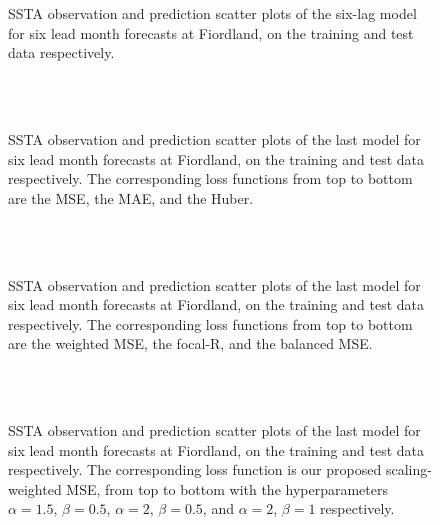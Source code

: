 \documentclass[11pt, a4paper]{article}
\begin{document}
\begin{figure}[H]
\centering
{}
\caption{SSTA observation and prediction scatter plots of the six-lag model for six lead month forecasts at Fiordland, on the training and test data respectively.}
\end{figure}

\begin{figure}[H]
\centering
{}
\\
\\
\caption{SSTA observation and prediction scatter plots of the last model for six lead month forecasts at Fiordland, on the training and test data respectively. The corresponding loss functions from top to bottom are the MSE, the MAE, and the Huber.}
\end{figure}

\begin{figure}[H]
\centering
{}
\\
\\
\caption{SSTA observation and prediction scatter plots of the last model for six lead month forecasts at Fiordland, on the training and test data respectively. The corresponding loss functions from top to bottom are the weighted MSE, the focal-R, and the balanced MSE.}
\end{figure}

\begin{figure}[H]
\centering
{}
\\
\\
\caption{SSTA observation and prediction scatter plots of the last model for six lead month forecasts at Fiordland, on the training and test data respectively. The corresponding loss function is our proposed scaling-weighted MSE, from top to bottom with the hyperparameters $\alpha=1.5$, $\beta=0.5$, $\alpha=2$, $\beta=0.5$, and $\alpha=2$, $\beta=1$ respectively.}
\end{figure}
\end{document}
